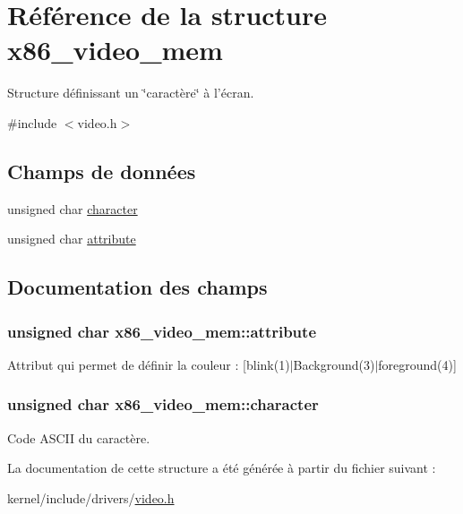 \hypertarget{structx86__video__mem}{\section{\-Référence de la structure x86\-\_\-video\-\_\-mem}
\label{structx86__video__mem}
}


\-Structure définissant un \char`\"{}caractère\char`\"{} à l'écran.  




{\ttfamily \#include $<$video.\-h$>$}

\subsection*{\-Champs de données}
\begin{DoxyCompactItemize}
\item 
unsigned char \hyperlink{structx86__video__mem_a806c83cac2d0536c833f810347f5539a}{character}
\item 
unsigned char \hyperlink{structx86__video__mem_ab513d18ce9ef33e2d22e426973fd7417}{attribute}
\end{DoxyCompactItemize}


\subsection{\-Documentation des champs}
\hypertarget{structx86__video__mem_ab513d18ce9ef33e2d22e426973fd7417}{
\subsubsection[{attribute}]{\setlength{\rightskip}{0pt plus 5cm}unsigned char {\bf x86\-\_\-video\-\_\-mem\-::attribute}}}\label{structx86__video__mem_ab513d18ce9ef33e2d22e426973fd7417}
\-Attribut qui permet de définir la couleur \-: \mbox{[}blink(1)$|$\-Background(3)$|$foreground(4)\mbox{]} \hypertarget{structx86__video__mem_a806c83cac2d0536c833f810347f5539a}{
\subsubsection[{character}]{\setlength{\rightskip}{0pt plus 5cm}unsigned char {\bf x86\-\_\-video\-\_\-mem\-::character}}}\label{structx86__video__mem_a806c83cac2d0536c833f810347f5539a}
\-Code \-A\-S\-C\-I\-I du caractère. 

\-La documentation de cette structure a été générée à partir du fichier suivant \-:\begin{DoxyCompactItemize}
\item 
kernel/include/drivers/\hyperlink{video_8h}{video.\-h}\end{DoxyCompactItemize}
